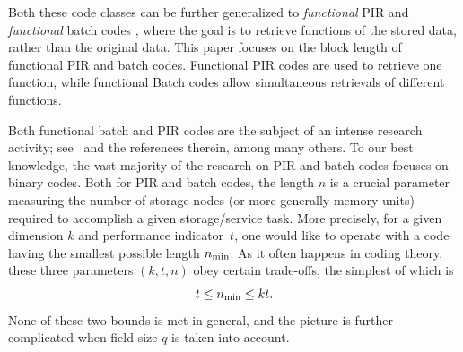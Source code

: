 \documentclass[11pt,a4paper]{article}
\theoremstyle{definition}
\newcommand{\ABK}[1]{{\color{orange} Altan: #1}}
\begin{document}

Both these code classes can be further generalized to \textit{functional} PIR and \textit{functional} batch codes \cite{zhang2020bounds}, where the goal is to retrieve functions of the stored data, rather than the original data. This paper focuses on the block length of functional PIR and batch codes. Functional PIR codes
are used to retrieve one function, while functional Batch
codes allow simultaneous retrievals of different functions.


Both functional batch and PIR codes are the subject of an intense research activity; see~\cite{chor1998private,fazeli2015pir,ishai2004batch,zhang2020bounds,hollmann2023some, lember2024equal, yohananov2021almost,nassar2021array, yohananov2025optimal} and the references therein, among many others. To our best knowledge, the vast majority of the research on PIR and batch codes focuses on binary codes.
Both for PIR and batch codes, the length $n$ is a crucial parameter measuring the number of storage nodes (or more generally memory units) required to accomplish a given storage/service task. More precisely, for a  given dimension $k$ and performance indicator~$t$, one would like to operate with a code having the smallest possible length $n_{\textnormal{min}}$. As it often happens in coding theory, these three parameters $(k,t,n)$ obey certain trade-offs, the simplest of which is
$$t\leq n_{\textnormal{min}}\leq kt.$$ 
None of these two bounds is met in general, and the picture is further complicated when field size $q$ is taken into account.
\end{document}
